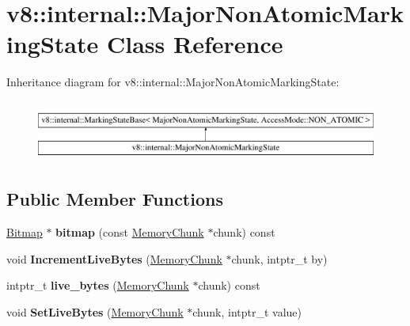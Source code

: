 \hypertarget{classv8_1_1internal_1_1MajorNonAtomicMarkingState}{}\section{v8\+:\+:internal\+:\+:Major\+Non\+Atomic\+Marking\+State Class Reference}
\label{classv8_1_1internal_1_1MajorNonAtomicMarkingState}
Inheritance diagram for v8\+:\+:internal\+:\+:Major\+Non\+Atomic\+Marking\+State\+:\begin{figure}[H]
\begin{center}
\leavevmode
\includegraphics[height=2.000000cm]{classv8_1_1internal_1_1MajorNonAtomicMarkingState}
\end{center}
\end{figure}
\subsection*{Public Member Functions}
\begin{DoxyCompactItemize}
\item 
\mbox{\label{classv8_1_1internal_1_1MajorNonAtomicMarkingState_a52946f5f9e7e9b4f05c56559aa596b34}} 
\mbox{\hyperlink{classv8_1_1internal_1_1Bitmap}{Bitmap}} $\ast$ {\bfseries bitmap} (const \mbox{\hyperlink{classv8_1_1internal_1_1MemoryChunk}{Memory\+Chunk}} $\ast$chunk) const
\item 
\mbox{\label{classv8_1_1internal_1_1MajorNonAtomicMarkingState_affcbf9e2b7c727c4bcf8a2fa5439d31a}} 
void {\bfseries Increment\+Live\+Bytes} (\mbox{\hyperlink{classv8_1_1internal_1_1MemoryChunk}{Memory\+Chunk}} $\ast$chunk, intptr\+\_\+t by)
\item 
\mbox{\label{classv8_1_1internal_1_1MajorNonAtomicMarkingState_a2328599689f81ddafa9fcca407e56099}} 
intptr\+\_\+t {\bfseries live\+\_\+bytes} (\mbox{\hyperlink{classv8_1_1internal_1_1MemoryChunk}{Memory\+Chunk}} $\ast$chunk) const
\item 
\mbox{\label{classv8_1_1internal_1_1MajorNonAtomicMarkingState_a698085f756dd35a36558f30605f5bdbb}} 
void {\bfseries Set\+Live\+Bytes} (\mbox{\hyperlink{classv8_1_1internal_1_1MemoryChunk}{Memory\+Chunk}} $\ast$chunk, intptr\+\_\+t value)
\end{DoxyCompactItemize}


